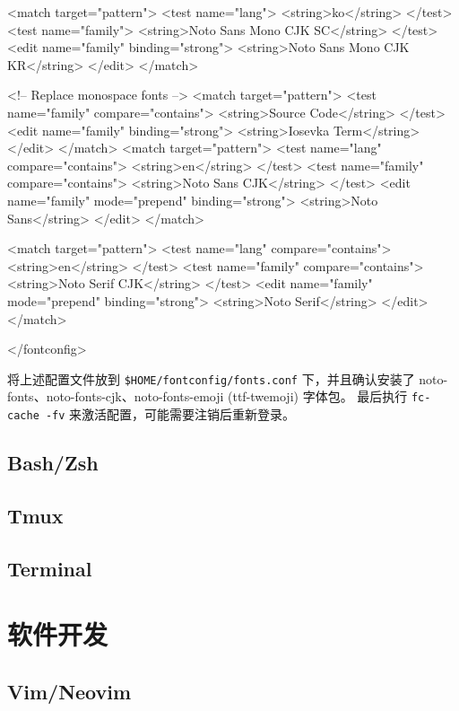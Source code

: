 \begin{lstcode}
  <match target="pattern">
    <test name="lang">
      <string>ko</string>
    </test>
    <test name="family">
      <string>Noto Sans Mono CJK SC</string>
    </test>
    <edit name="family" binding="strong">
      <string>Noto Sans Mono CJK KR</string>
    </edit>
  </match>
  
  <!-- Replace monospace fonts -->
  <match target="pattern">
    <test name="family" compare="contains">
      <string>Source Code</string>
    </test>
    <edit name="family" binding="strong">
      <string>Iosevka Term</string>
    </edit>
  </match>
    <match target="pattern">
    <test name="lang" compare="contains">
      <string>en</string>
    </test>
    <test name="family" compare="contains">
      <string>Noto Sans CJK</string>
    </test>
    <edit name="family" mode="prepend" binding="strong">
      <string>Noto Sans</string>
    </edit>
  </match>

  <match target="pattern">
    <test name="lang" compare="contains">
      <string>en</string>
    </test>
    <test name="family" compare="contains">
      <string>Noto Serif CJK</string>
    </test>
    <edit name="family" mode="prepend" binding="strong">
      <string>Noto Serif</string>
    </edit>
  </match>

</fontconfig>
\end{lstcode}

将上述配置文件放到 \lstinline{$HOME/fontconfig/fonts.conf} 下，并且确认安装了 noto-fonts、noto-fonts-cjk、noto-fonts-emoji (ttf-twemoji) 字体包。
最后执行 \lstinline{fc-cache -fv} 来激活配置，可能需要注销后重新登录。

\subsection{Bash/Zsh}

\subsection{Tmux}

\subsection{Terminal}

\section{软件开发}
\subsection{Vim/Neovim}

